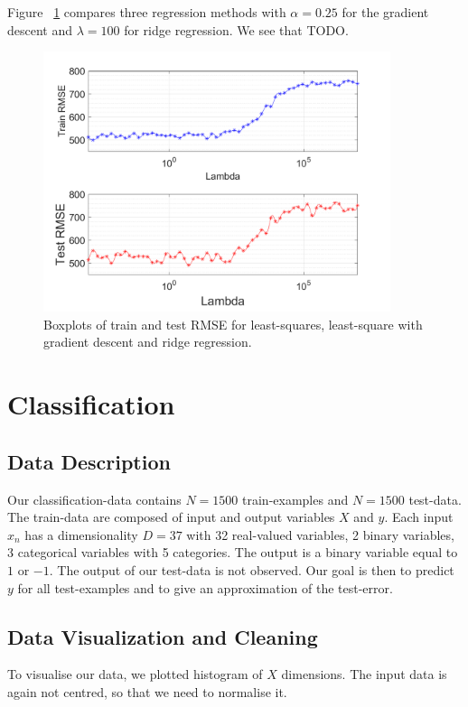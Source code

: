\documentclass{article} %
\begin{document}
Figure ~\ref{fig:reg_compareMethods} compares three regression methods with $\alpha = 0.25$ for the gradient descent and $\lambda = 100$ for ridge regression. We see that TODO.

\begin{figure}[!h] %
	\center
	\includegraphics[width=4in]{figures/lambdaRMSE.png}
	\caption{Boxplots of train and test RMSE for least-squares, least-square with gradient descent and ridge regression.}
	\label{fig:reg_compareMethods}
\end{figure}

\section{Classification}
\subsection{Data Description}
Our classification-data contains $N=1500$ train-examples and $N=1500$ test-data. The train-data are composed of input and output variables $X$ and $y$. Each input $x_n$ has a dimensionality $D=37$ with 32 real-valued variables, 2 binary variables, 3 categorical variables with 5 categories. The output is a binary variable equal to $1$ or $-1$. The output of our test-data is not observed. Our goal is then to predict $y$ for all test-examples and to give an approximation of the test-error.

\subsection{Data Visualization and Cleaning}
To visualise our data, we plotted histogram of $X$ dimensions. The input data is again not centred, so that we need to normalise it.
\end{document}
